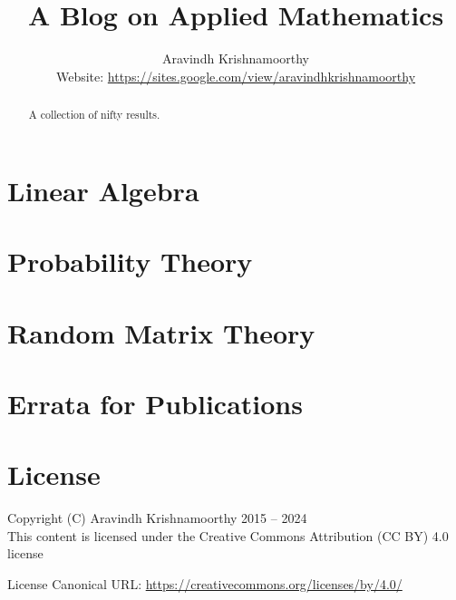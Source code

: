 \documentclass[a4paper,dvipsnames]{report}
\title{A Blog on Applied Mathematics}
\author{Aravindh Krishnamoorthy\\\small Website: \url{https://sites.google.com/view/aravindhkrishnamoorthy}}
\begin{document}
\maketitle
\renewcommand{\abstractname}{Preface}
\begin{abstract}
\begin{center}
 	A collection of nifty results.
\end{center}
\end{abstract}
\tableofcontents

\chapter{Linear Algebra}





\chapter{Probability Theory}





\chapter{Random Matrix Theory}



\chapter{Errata for Publications}


\chapter{License}
Copyright (C) Aravindh Krishnamoorthy 2015 -- 2024\\
This content is licensed under the Creative Commons Attribution (CC BY) 4.0 license

\noindent License Canonical URL: \url{https://creativecommons.org/licenses/by/4.0/}


\end{document}

